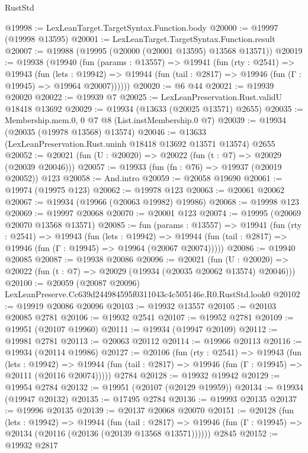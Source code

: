 \begin{lexlean}{RustStd}
\begin{coremodule}
@19998 := LexLeanTarget.TargetSyntax.Function.body
@20000 := @19997 (@19998 @13595)
@20001 := LexLeanTarget.TargetSyntax.Function.result
@20007 := @19988 (@19995 (@20000 (@20001 @13595) @13568 @13571))
@20019 := @19938
    (@19940
      (fun (params : @13557) =>
      @19941
        (fun (rty : @2541) =>
        @19943
          (fun (lets : @19942) =>
          @19944 (fun (tail : @2817) => @19946 (fun (Γ : @19945) => @19964 @20007))))))
@20020 := @6 @44
@20021 := @19939 @20020
@20022 := @19939 @7
@20025 := LexLeanPreservation.Rust.validU @18418 @13692
@20029 := @19934 (@13633 (@20025 @13571) @2655)
@20035 := Membership.mem.{0, 0} @7 @8 (List.instMembership.{0} @7)
@20039 := @19934 (@20035 (@19978 @13568) @13574)
@20046 := @13633 (LexLeanPreservation.Rust.uninh @18418 @13692 @13571 @13574) @2655
@20052 := @20021 (fun (U : @20020) => @20022 (fun (t : @7) => @20029 (@20039 @20046)))
@20057 := @19933 (fun (fn : @76) => @19937 (@20019 @20052)) @123
@20058 := And.intro
@20059 := @20058 @19690
@20061 := @19974 (@19975 @123)
@20062 := @19978 @123
@20063 := @20061 @20062
@20067 := @19934 (@19966 (@20063 @19982) @19986)
@20068 := @19998 @123
@20069 := @19997 @20068
@20070 := @20001 @123
@20074 := @19995 (@20069 @20070 @13568 @13571)
@20085 := fun (params : @13557) =>
  @19941
    (fun (rty : @2541) =>
    @19943
      (fun (lets : @19942) =>
      @19944 (fun (tail : @2817) => @19946 (fun (Γ : @19945) => @19964 (@20067 @20074)))))
@20086 := @19940 @20085
@20087 := @19938 @20086
@20096 := @20021
    (fun (U : @20020) => @20022 (fun (t : @7) => @20029 (@19934 (@20035 @20062 @13574) @20046)))
@20100 := @20059 (@20087 @20096) LexLeanPreserve.Cc639d244984595f0311043c4c505146e.R0.RustStd.look0
@20102 := @19919 @20086 @20096
@20103 := @19932 @13557
@20105 := @20103 @20085 @2781
@20106 := @19932 @2541
@20107 := @19952 @2781
@20109 := @19951 (@20107 @19960)
@20111 := @19934 (@19947 @20109)
@20112 := @19981 @2781
@20113 := @20063 @20112
@20114 := @19966 @20113
@20116 := @19934 (@20114 @19986)
@20127 := @20106
    (fun (rty : @2541) =>
    @19943
      (fun (lets : @19942) =>
      @19944 (fun (tail : @2817) => @19946 (fun (Γ : @19945) => @20111 (@20116 @20074)))))
    @2784
@20128 := @19932 @19942
@20129 := @19954 @2784
@20132 := @19951 (@20107 (@20129 @19959))
@20134 := @19934 (@19947 @20132)
@20135 := @17495 @2784
@20136 := @19993 @20135
@20137 := @19996 @20135
@20139 := @20137 @20068 @20070
@20151 := @20128
    (fun (lets : @19942) =>
    @19944
      (fun (tail : @2817) =>
      @19946 (fun (Γ : @19945) => @20134 (@20116 (@20136 (@20139 @13568 @13571))))))
    @2845
@20152 := @19932 @2817

\end{coremodule}
\end{lexlean}
